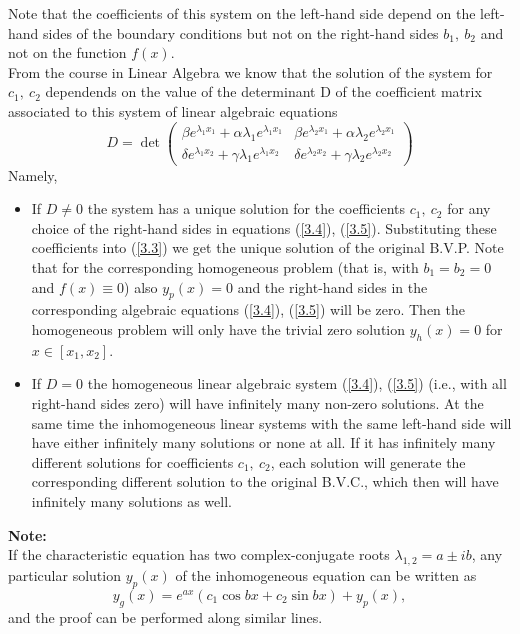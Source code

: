 \documentclass[11pt,a4paper,twoside]{article}
\begin{document}
	Note that the coefficients of this system on the left-hand side depend on the left-hand sides of the boundary conditions but not on the right-hand sides $b_1,\ b_2$ and not on the function $f(x)$.\\
	From the course in Linear Algebra we know that the solution of the system for $c_1,\ c_2$ dependends on the value of the determinant D of the coefficient matrix associated to this system of linear algebraic equations
	$$
	D
	= \det
	\begin{pmatrix}
		\beta e^{\lambda_1x_1} + \alpha\lambda_1e^{\lambda_1x_1} & \beta e^{\lambda_2x_1} + \alpha\lambda_2e^{\lambda_2x_1}\\
		\delta e^{\lambda_1x_2} + \gamma\lambda_1e^{\lambda_1x_2} & \delta e^{\lambda_2x_2} + \gamma\lambda_2e^{\lambda_2x_2}
	\end{pmatrix}
	$$
	Namely,
	\begin{itemize}
		\item If $D \neq 0$ the system has a unique solution for the coefficients $c_1,\ c_2$ for any choice of the right-hand sides in equations (\ref{3.4}), (\ref{3.5}). Substituting these coefficients into (\ref{3.3}) we get the unique solution of the original B.V.P. Note that for the corresponding homogeneous problem (that is, with $b_1 = b_2 = 0$ and $f(x) \equiv 0$) also $y_p(x) = 0$ and the right-hand sides in the corresponding algebraic equations (\ref{3.4}), (\ref{3.5}) will be zero. Then the homogeneous problem will only have the trivial zero solution $y_h(x) = 0$ for $x \in [x_1, x_2]$.
		\item If $D = 0$ the homogeneous linear algebraic system (\ref{3.4}), (\ref{3.5}) (i.e., with all right-hand sides zero) will have infinitely many non-zero solutions. At the same time the inhomogeneous linear systems with the same left-hand side will have either infinitely many solutions or none at all. If it has infinitely many different solutions for coefficients $c_1,\ c_2$, each solution will generate the corresponding different solution to the original B.V.C., which then will have infinitely many solutions as well.
	\end{itemize}
	\textbf{Note:}\\
	If the characteristic equation has two complex-conjugate roots $\lambda_{1,2} = a \pm ib$, any particular solution $y_p(x)$ of the inhomogeneous equation can be written as
	\begin{equation}\label{3.6}
		y_g(x) = e^{ax}(c_1 \cos bx + c_2\sin bx) + y_p(x),
	\end{equation}
	and the proof can be performed along similar lines.
\end{document}

